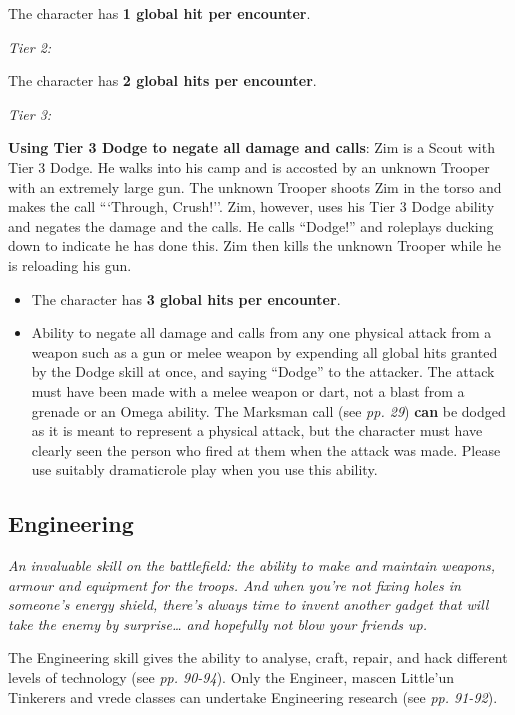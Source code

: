 The character has \textbf{1 global hit per encounter}.

\textit{Tier 2:}

The character has \textbf{2 global hits per encounter}.

\textit{Tier 3:}

\textbf{Using Tier 3 Dodge to negate all damage and calls}: Zim is a Scout with Tier 3 Dodge. He walks into his camp and is accosted by an unknown Trooper with an extremely large gun. The unknown Trooper shoots Zim in the torso and makes the call ```Through, Crush!''. Zim, however, uses his Tier 3 Dodge ability and negates the damage and the calls. He calls ``Dodge!'' and roleplays ducking down to indicate he has done this. Zim then kills the unknown Trooper while he is reloading his gun.

\begin{itemize}
\item The character has \textbf{3 global hits per encounter}.

\item Ability to negate all damage and calls from any one physical attack from a weapon such as a gun or melee weapon by expending all global hits granted by the Dodge skill at once, and saying ``Dodge'' to the attacker. The attack must have been made with a melee weapon or dart, not a blast from a grenade or an Omega ability. The Marksman call (see \textit{pp. 29}) \textbf{can} be dodged as it is meant to represent a physical attack, but the character must have clearly seen the person who fired at them when the attack was made. Please use suitably dramaticrole play when you use this ability.

\end{itemize}
\subsection{Engineering}

\textit{An invaluable skill on the battlefield: the ability to make and maintain weapons, armour and equipment for the troops. And when you're not fixing holes in someone's energy shield, there's always time to invent another gadget that will take the enemy by surprise{\dots} and hopefully not blow your friends up.}

The Engineering skill gives the ability to analyse, craft, repair, and hack different levels of technology (see \textit{pp. 90-94}). Only the Engineer, mascen Little'un Tinkerers and vrede classes can undertake Engineering research (see \textit{pp. 91-92}).

